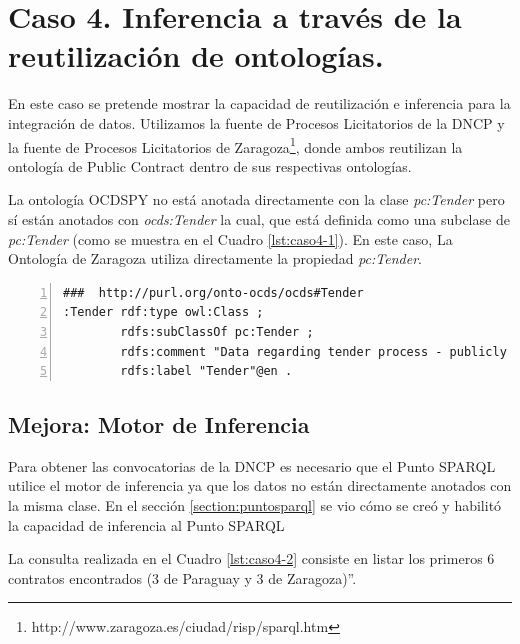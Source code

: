 \section{Caso 4. Inferencia a través de la reutilización de ontologías. }
\label{section:caso4}

En este caso se pretende mostrar la capacidad de reutilización e inferencia para la integración de datos. Utilizamos la fuente de Procesos Licitatorios de la DNCP y la fuente de Procesos Licitatorios de Zaragoza\footnote{http://www.zaragoza.es/ciudad/risp/sparql.htm}, donde ambos reutilizan la ontología de Public Contract dentro de sus respectivas ontologías. 

La ontología OCDSPY no está anotada directamente con la clase \textit{pc:Tender} pero sí están anotados con \textit{ocds:Tender} la cual, que está definida como una subclase de \textit{pc:Tender} (como se muestra en el Cuadro \ref{lst:caso4-1}). En este caso, La Ontología de Zaragoza utiliza directamente la propiedad \textit{pc:Tender}.

\noindent\begin{minipage}[c]{\textwidth}
\begin{lstlisting}[captionpos=b, caption=Extensión de la ontología reutilizando PC, label={lst:caso4-1},  numbers=left,  numberstyle=\tiny\color{mygray},frame=single]
###  http://purl.org/onto-ocds/ocds#Tender
:Tender rdf:type owl:Class ;
        rdfs:subClassOf pc:Tender ;
        rdfs:comment "Data regarding tender process - publicly inviting prospective contractors to submit bids for evaluation and selecting a winner or winners"@en ;
        rdfs:label "Tender"@en .
 \end{lstlisting}
\end{minipage}

\subsection{Mejora: Motor de Inferencia}
Para obtener las convocatorias de la DNCP es necesario que el Punto SPARQL utilice el motor de inferencia ya que los datos no están directamente anotados con la misma clase. En el sección \ref{section:puntosparql} se vio cómo se creó y habilitó la capacidad de inferencia al Punto SPARQL\hfill \break

La consulta realizada en el Cuadro \ref{lst:caso4-2} consiste en listar los primeros 6 contratos encontrados (3 de Paraguay y 3 de Zaragoza)”.\hfill \break
 
